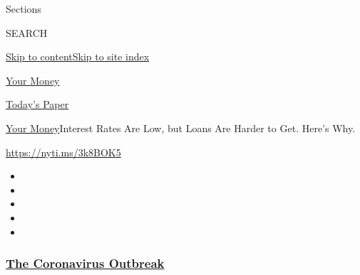 Sections

SEARCH

\protect\hyperlink{site-content}{Skip to
content}\protect\hyperlink{site-index}{Skip to site index}

\href{https://www.nytimes3xbfgragh.onion/section/your-money}{Your Money}

\href{https://myaccount.nytimes3xbfgragh.onion/auth/login?response_type=cookie\&client_id=vi}{}

\href{https://www.nytimes3xbfgragh.onion/section/todayspaper}{Today's
Paper}

\href{/section/your-money}{Your Money}\textbar{}Interest Rates Are Low,
but Loans Are Harder to Get. Here's Why.

\url{https://nyti.ms/3k8BOK5}

\begin{itemize}
\item
\item
\item
\item
\item
\end{itemize}

\hypertarget{the-coronavirus-outbreak}{%
\subsubsection{\texorpdfstring{\href{https://www.nytimes3xbfgragh.onion/news-event/coronavirus?name=styln-coronavirus-national\&region=TOP_BANNER\&variant=undefined\&block=storyline_menu_recirc\&action=click\&pgtype=Article\&impression_id=66c739c0-e376-11ea-9f78-6b3cee7e2386}{The
Coronavirus
Outbreak}}{The Coronavirus Outbreak}}\label{the-coronavirus-outbreak}}

